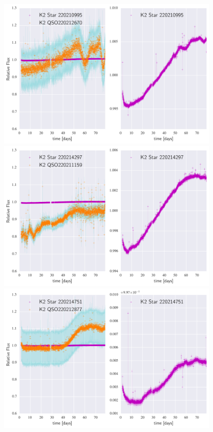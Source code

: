 \documentclass[a4paper,fleqn,usenatbib]{mnras}
\begin{document}
  
   \begin{figure}
 	\includegraphics[width=\columnwidth]{220212670NearestNeighbor.png}
 	\includegraphics[width=\columnwidth]{220211159NearestNeighbor.png}
 	\includegraphics[width=\columnwidth]{220212877NearestNeighbor.png}
   	\caption{}
   	\label{fig:example_figure}
   \end{figure}
 
\end{document}

